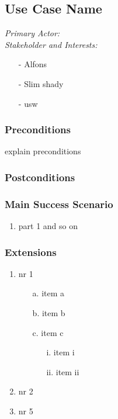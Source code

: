 \documentclass[./detailed_overview_usecases.tex]{subfiles}
\begin{document}
    \subsection{Use Case Name}

    \textit{Primary Actor:}
    \\
    \textit{Stakeholder and Interests:}
    \begin{itemize}
        \item[-] Alfons
        \item[-] Slim shady
        \item[-] usw
    \end{itemize}

    \subsubsection*{Preconditions}
    explain preconditions

    \subsubsection*{Postconditions}

    \subsubsection*{Main Success Scenario}
    \begin{enumerate}
        \item part 1 and so on
    \end{enumerate}

    \subsubsection*{Extensions}
    \begin{enumerate}
        \item nr 1 \begin{itemize}
                       \item[a.] item a
                       \item[b.] item b
                       \item[c.] item c
                                \begin{itemize}
                                     \item[i.] item i
                                     \item[ii.] item ii
                                \end{itemize}
                    \end{itemize}
        \item nr 2
        \setcounter{enumi}{4}
        \item nr 5
    \end{enumerate}
\end{document}
